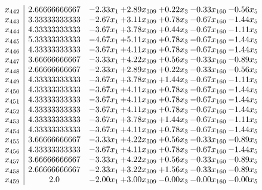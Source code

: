 \documentclass[8pt]{article}
\begin{document}
\[\begin{array}{c| c c@{\hskip 2pt} c@{\hskip 2pt} c@{\hskip 2pt} c@{\hskip 2pt} c@{\hskip 2pt} }
 x_{442}   &  2.66666666667 & -2.33 x_{1} & +  2.89 x_{309} & +  0.22 x_{3} & -0.33 x_{160} & -0.56 x_{5}\\
 x_{443}   &  3.33333333333 & -2.67 x_{1} & +  3.11 x_{309} & +  0.78 x_{3} & -0.67 x_{160} & -1.44 x_{5}\\
 x_{444}   &  4.33333333333 & -3.67 x_{1} & +  3.78 x_{309} & +  0.44 x_{3} & -0.67 x_{160} & -1.11 x_{5}\\
 x_{445}   &  5.33333333333 & -4.67 x_{1} & +  5.11 x_{309} & +  0.78 x_{3} & -0.67 x_{160} & -1.44 x_{5}\\
 x_{446}   &  4.33333333333 & -3.67 x_{1} & +  4.11 x_{309} & +  0.78 x_{3} & -0.67 x_{160} & -1.44 x_{5}\\
 x_{447}   &  3.66666666667 & -3.33 x_{1} & +  4.22 x_{309} & +  0.56 x_{3} & -0.33 x_{160} & -0.89 x_{5}\\
 x_{448}   &  2.66666666667 & -2.33 x_{1} & +  2.89 x_{309} & +  0.22 x_{3} & -0.33 x_{160} & -0.56 x_{5}\\
 x_{449}   &  4.33333333333 & -3.67 x_{1} & +  3.78 x_{309} & +  1.44 x_{3} & -0.67 x_{160} & -1.11 x_{5}\\
 x_{450}   &  4.33333333333 & -3.67 x_{1} & +  4.11 x_{309} & +  0.78 x_{3} & -0.67 x_{160} & -1.44 x_{5}\\
 x_{451}   &  4.33333333333 & -3.67 x_{1} & +  4.11 x_{309} & +  0.78 x_{3} & -0.67 x_{160} & -1.44 x_{5}\\
 x_{452}   &  4.33333333333 & -3.67 x_{1} & +  4.11 x_{309} & +  0.78 x_{3} & -0.67 x_{160} & -1.44 x_{5}\\
 x_{453}   &  4.33333333333 & -3.67 x_{1} & +  3.78 x_{309} & +  1.44 x_{3} & -0.67 x_{160} & -1.11 x_{5}\\
 x_{454}   &  4.33333333333 & -3.67 x_{1} & +  4.11 x_{309} & +  0.78 x_{3} & -0.67 x_{160} & -1.44 x_{5}\\
 x_{455}   &  3.66666666667 & -3.33 x_{1} & +  4.22 x_{309} & +  0.56 x_{3} & -0.33 x_{160} & -0.89 x_{5}\\
 x_{456}   &  4.33333333333 & -3.67 x_{1} & +  4.11 x_{309} & +  0.78 x_{3} & -0.67 x_{160} & -1.44 x_{5}\\
 x_{457}   &  3.66666666667 & -3.33 x_{1} & +  4.22 x_{309} & +  0.56 x_{3} & -0.33 x_{160} & -0.89 x_{5}\\
 x_{458}   &  2.66666666667 & -2.33 x_{1} & +  3.22 x_{309} & +  1.56 x_{3} & -0.33 x_{160} & -0.89 x_{5}\\
 x_{459}   &  2.0 & -2.00 x_{1} & +  3.00 x_{309} & -0.00 x_{3} & -0.00 x_{160} & -0.00 x_{5}\\

\end{array}\]
\end{document}
